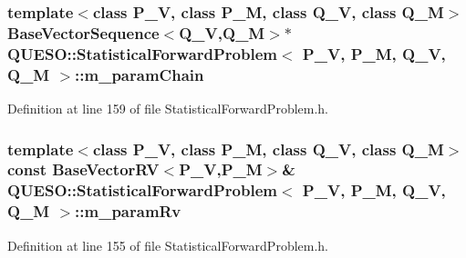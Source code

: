 \hypertarget{class_q_u_e_s_o_1_1_statistical_forward_problem_add86e10f5d013e532d2687b0ed58dc0e}{
\subsubsection[{m\-\_\-param\-Chain}]{\setlength{\rightskip}{0pt plus 5cm}template$<$class P\-\_\-\-V, class P\-\_\-\-M, class Q\-\_\-\-V, class Q\-\_\-\-M$>$ {\bf Base\-Vector\-Sequence}$<$Q\-\_\-\-V,Q\-\_\-\-M$>$$\ast$ {\bf Q\-U\-E\-S\-O\-::\-Statistical\-Forward\-Problem}$<$ P\-\_\-\-V, P\-\_\-\-M, Q\-\_\-\-V, Q\-\_\-\-M $>$\-::m\-\_\-param\-Chain\hspace{0.3cm}{\ttfamily [private]}}}\label{class_q_u_e_s_o_1_1_statistical_forward_problem_add86e10f5d013e532d2687b0ed58dc0e}


Definition at line 159 of file Statistical\-Forward\-Problem.\-h.

\hypertarget{class_q_u_e_s_o_1_1_statistical_forward_problem_ab4933700b21362717461ce7da3c8a0e8}{
\subsubsection[{m\-\_\-param\-Rv}]{\setlength{\rightskip}{0pt plus 5cm}template$<$class P\-\_\-\-V, class P\-\_\-\-M, class Q\-\_\-\-V, class Q\-\_\-\-M$>$ const {\bf Base\-Vector\-R\-V}$<$P\-\_\-\-V,P\-\_\-\-M$>$\& {\bf Q\-U\-E\-S\-O\-::\-Statistical\-Forward\-Problem}$<$ P\-\_\-\-V, P\-\_\-\-M, Q\-\_\-\-V, Q\-\_\-\-M $>$\-::m\-\_\-param\-Rv\hspace{0.3cm}{\ttfamily [private]}}}\label{class_q_u_e_s_o_1_1_statistical_forward_problem_ab4933700b21362717461ce7da3c8a0e8}


Definition at line 155 of file Statistical\-Forward\-Problem.\-h.

